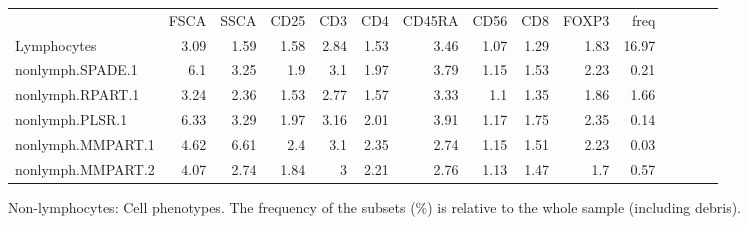 \begin{table}[h]\footnotesize
\centering
\begin{tabular}{lrrrrrrrrrrrrrr}
\rowcolor{Gray} 
            & FSCA & SSCA & CD25 & CD3  & CD4  & CD45RA & CD56 & CD8  & FOXP3 & freq \\
Lymphocytes & 3.09 & 1.59 & 1.58 & 2.84 & 1.53 & 3.46   & 1.07 & 1.29 & 1.83  & 16.97 \\
nonlymph.SPADE.1     & 6.1  & 3.25 & 1.9  & 3.1  & 1.97 & 3.79   & 1.15 & 1.53 & 2.23  & 0.21 \\
nonlymph.RPART.1     & 3.24 & 2.36 & 1.53 & 2.77 & 1.57 & 3.33   & 1.1  & 1.35 & 1.86  & 1.66 \\
nonlymph.PLSR.1      & 6.33 & 3.29 & 1.97 & 3.16 & 2.01 & 3.91   & 1.17 & 1.75 & 2.35  & 0.14 \\
nonlymph.MMPART.1    & 4.62 & 6.61 & 2.4  & 3.1  & 2.35 & 2.74   & 1.15 & 1.51 & 2.23  & 0.03 \\
nonlymph.MMPART.2    & 4.07 & 2.74 & 1.84 & 3    & 2.21 & 2.76   & 1.13 & 1.47 & 1.7   & 0.57 \\
\end{tabular}
{ Non-lymphocytes: Cell phenotypes. }
{
    The frequency of the subsets (\%) is relative to the whole sample (including debris).
}
\end{table}


